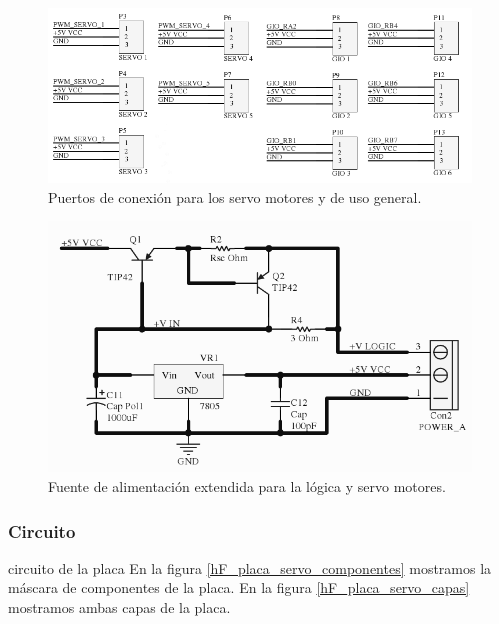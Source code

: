\begin{figure}
	\centering
	\includegraphics[scale=.35]{figuras/servo_schemaPort.png}
	\caption{Puertos de conexi\'on para los servo motores y de uso general.}
	\label{hF_placa_servo_schema3}
\end{figure}

\begin{figure}
	\centering
	\includegraphics[scale=.3]{figuras/servo_schemaFuente.png}
	\caption{Fuente de alimentaci\'on extendida para la l\'ogica y servo motores.}
	\label{hF_placa_servo_schema4}
\end{figure}

\subsubsection{Circuito}
\label{h_placas_servos_circuito}

circuito de la placa
En la figura \ref{hF_placa_servo_componentes} mostramos la m\'ascara de componentes de la placa.
En la figura \ref{hF_placa_servo_capas} mostramos ambas capas de la placa.

